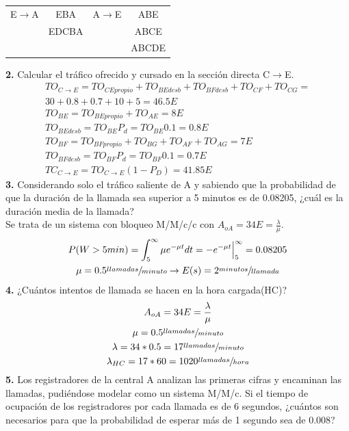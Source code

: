\begin{exercise}[5]
\begin{center}
\begin{tabular}{c c c c}
E$\to$A & EBA  		& A$\to$E 	& ABE 	\\
 		& EDCBA		&			& ABCE	\\
 		& 			&			& ABCDE	\\
\end{tabular}
\end{center}
\textbf{2.} Calcular el tráfico ofrecido y cursado en la sección directa C$\to$E.\\
\begin{gather*}
TO_{C\to E}=TO_{CEpropio}+TO_{BEdesb}+TO_{BFdesb}+TO_{CF}+TO_{CG}=\\
30+0.8+0.7+10+5=46.5E\\
TO_{BE}=TO_{BEpropio}+TO_{AE}=8E\\
TO_{BEdesb}=TO_{BE}P_d=TO_{BE}0.1=0.8E\\
TO_{BF}=TO_{BFpropio}+TO_{BG}+TO_{AF}+TO_{AG}=7E\\
TO_{BFdesb}=TO_{BF}P_d=TO_{BF}0.1=0.7E\\
TC_{C\to E}=TO_{C\to E}(1-P_D)=41.85E
\end{gather*}
\textbf{3.} Considerando solo el tráfico saliente de A y sabiendo que la probabilidad de que la duración de la llamada sea superior a 5 minutos es de 0.08205, ¿cuál es la duración media de la llamada?\\
Se trata de un sistema con bloqueo M/M/c/c con $A_{oA}=34E=\frac{\lambda}{\mu}$.
\begin{gather*}
P(W>5min)=\int_{5}^{\infty}\mu e^{-\mu t}dt=-e^{-\mu t}\Big|_{5}^{\infty}=0.08205\\
\mu=0.5\sfrac{llamadas}{minuto}\to E(s)=2\sfrac{minutos}{llamada}
\end{gather*}
\textbf{4.} ¿Cuántos intentos de llamada se hacen en la hora cargada(HC)?\\
\begin{gather*}
A_{oA}=34E=\frac{\lambda}{\mu}\\
\mu=0.5\sfrac{llamadas}{minuto}\\
\lambda=34*0.5=17\sfrac{llamadas}{minuto}\\
\lambda_{HC}=17*60=1020\sfrac{llamadas}{hora}
\end{gather*}
\textbf{5.} Los registradores de la central A analizan las primeras cifras y encaminan las llamadas, pudiéndose modelar como un sistema M/M/c. Si el tiempo de ocupación de los registradores por cada llamada es de 6 segundos, ¿cuántos son necesarios para que la probabilidad de esperar más de 1 segundo sea de 0.008?\\
\begin{gather*}

\end{gather*}
\end{exercise}
